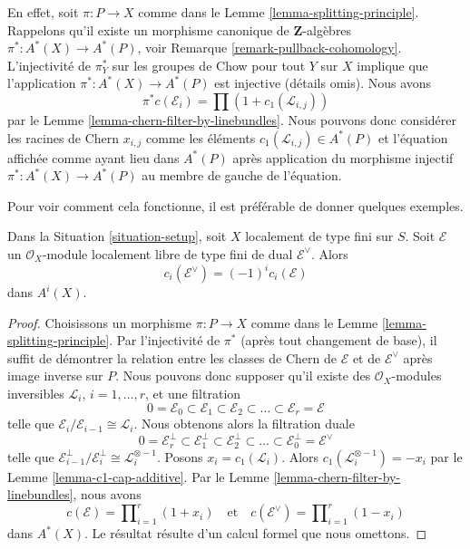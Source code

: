 \medskip\noindent
En effet, soit $\pi : P \to X$ comme dans le Lemme \ref{lemma-splitting-principle}.
Rappelons qu'il existe un morphisme canonique de $\mathbf{Z}$-algèbres
$\pi^* : A^*(X) \to A^*(P)$, voir
Remarque \ref{remark-pullback-cohomology}. L'injectivité de $\pi_Y^*$
sur les groupes de Chow pour tout $Y$ sur $X$ implique que l'application
$\pi^* : A^*(X) \to A^*(P)$ est injective (détails omis).
Nous avons
$$
\pi^*c(\mathcal{E}_i) = \prod (1 + c_1(\mathcal{L}_{i, j}))
$$
par le Lemme \ref{lemma-chern-filter-by-linebundles}. Nous pouvons donc considérer les
racines de Chern $x_{i, j}$ comme les éléments $c_1(\mathcal{L}_{i, j}) \in A^*(P)$
et l'équation affichée comme ayant lieu dans $A^*(P)$ après
application du morphisme injectif $\pi^* : A^*(X) \to A^*(P)$ au
membre de gauche de l'équation.

\medskip\noindent
Pour voir comment cela fonctionne, il est préférable de donner quelques exemples.

\begin{lemma}
\label{lemma-chern-classes-dual}
Dans la Situation \ref{situation-setup}, soit $X$ localement de type fini sur $S$.
Soit $\mathcal{E}$ un $\mathcal{O}_X$-module localement libre de type fini
de dual $\mathcal{E}^\vee$. Alors
$$
c_i(\mathcal{E}^\vee) = (-1)^i c_i(\mathcal{E})
$$
dans $A^i(X)$.
\end{lemma}

\begin{proof}
Choisissons un morphisme $\pi : P \to X$ comme dans le
Lemme \ref{lemma-splitting-principle}.
Par l'injectivité de $\pi^*$ (après tout changement de base),
il suffit de démontrer la relation entre
les classes de Chern de $\mathcal{E}$ et de $\mathcal{E}^\vee$
après image inverse sur $P$. Nous pouvons donc supposer qu'il
existe des $\mathcal{O}_X$-modules inversibles
${\mathcal L}_i$, $i = 1, \ldots, r$,
et une filtration
$$
0 = \mathcal{E}_0 \subset \mathcal{E}_1 \subset \mathcal{E}_2
\subset \ldots \subset \mathcal{E}_r = \mathcal{E}
$$
telle que $\mathcal{E}_i/\mathcal{E}_{i - 1} \cong \mathcal{L}_i$.
Nous obtenons alors la filtration duale
$$
0 = \mathcal{E}_r^\perp \subset \mathcal{E}_1^\perp \subset \mathcal{E}_2^\perp
\subset \ldots \subset \mathcal{E}_0^\perp = \mathcal{E}^\vee
$$
telle que $\mathcal{E}_{i - 1}^\perp/\mathcal{E}_i^\perp \cong
\mathcal{L}_i^{\otimes -1}$.
Posons $x_i = c_1(\mathcal{L}_i)$.
Alors $c_1(\mathcal{L}_i^{\otimes -1}) = - x_i$
par le Lemme \ref{lemma-c1-cap-additive}.
Par le Lemme \ref{lemma-chern-filter-by-linebundles},
nous avons
$$
c(\mathcal{E}) = \prod\nolimits_{i = 1}^r (1 + x_i)
\quad\text{et}\quad
c(\mathcal{E}^\vee) = \prod\nolimits_{i = 1}^r (1 - x_i)
$$
dans $A^*(X)$. Le résultat résulte d'un calcul formel
que nous omettons.
\end{proof}

